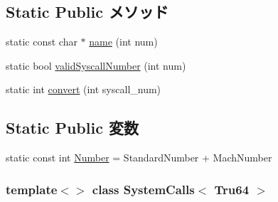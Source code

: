 \subsection*{Static Public メソッド}
\begin{DoxyCompactItemize}
\item 
static const char $\ast$ \hyperlink{classSystemCalls_3_01Tru64_01_4_a37ba7db7a75b51cfe17dcc3d2e3bd315}{name} (int num)
\item 
static bool \hyperlink{classSystemCalls_3_01Tru64_01_4_a16b77c15073fe4a4996b823f6e7a7096}{validSyscallNumber} (int num)
\item 
static int \hyperlink{classSystemCalls_3_01Tru64_01_4_a24f086060347dbac9793f83042198f5f}{convert} (int syscall\_\-num)
\end{DoxyCompactItemize}
\subsection*{Static Public 変数}
\begin{DoxyCompactItemize}
\item 
static const int \hyperlink{classSystemCalls_3_01Tru64_01_4_af34243ce3f8a4ba0ce3745d32a76ed1f}{Number} = StandardNumber + MachNumber
\end{DoxyCompactItemize}
\subsubsection*{template$<$$>$ class SystemCalls$<$ Tru64 $>$}



